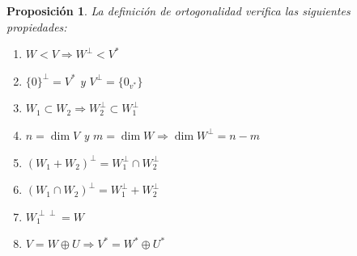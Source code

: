 \documentclass[10pt,a4paper,openright]{book}
\theoremstyle{break}
\newtheorem*{prop}{Proposición}
\begin{document}
\begin{prop}
La definición de ortogonalidad verifica las siguientes propiedades:
\begin{enumerate}
\item $W<V\Rightarrow W^\perp<V^*$
\item $\{0\}^\perp = V^*$ y $V^\perp = \{0_{v^*}\}$
\item $W_1\subset W_2\Rightarrow W_2^\perp \subset W_1^\perp$
\item $n=\dim V$ y $m=\dim W\Rightarrow \dim W^\perp = n-m$
\item $(W_1+W_2)^\perp = W_1^\perp \cap W_2^\perp$
\item $(W_1\cap W_2)^\perp= W_1^\perp + W_2^\perp$
\item $W_1^{\perp\perp}=W$
\item $V = W \oplus U \Rightarrow V^* = W^* \oplus U^*$
\end{enumerate}
\end{prop}
\end{document}
